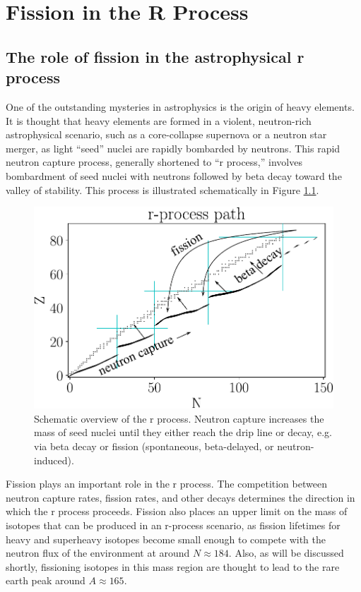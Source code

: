 \chapter{Fission in the R Process}\label{chap:rprocess}

\section{The role of fission in the astrophysical r process}
One of the outstanding mysteries in astrophysics is the origin of heavy elements. It is thought that heavy elements are formed in a violent, neutron-rich astrophysical scenario, such as a core-collapse supernova or a neutron star merger, as light ``seed'' nuclei are rapidly bombarded by neutrons. This rapid neutron capture process, generally shortened to ``r process,'' involves bombardment of seed nuclei with neutrons followed by beta decay toward the valley of stability.  This process is illustrated schematically in Figure \ref{fig:rprocpath}.

\begin{figure}
	\centering
	\includegraphics[width=0.8\linewidth]{TeX_files/rProc_path}
	\caption[Schematic overview of the r process]{Schematic overview of the r process. Neutron capture increases the mass of seed nuclei until they either reach the drip line or decay, e.g. via beta decay or fission (spontaneous, beta-delayed, or neutron-induced).}
	\label{fig:rprocpath}
\end{figure}

Fission plays an important role in the r process. The competition between neutron capture rates, fission rates, and other decays determines the direction in which the r process proceeds. Fission also places an upper limit on the mass of isotopes that can be produced in an r-process scenario, as fission lifetimes for heavy and superheavy isotopes become small enough to compete with the neutron flux of the environment at around $N\approx184$. Also, as will be discussed shortly, fissioning isotopes in this mass region are thought to lead to the rare earth peak around $A\approx165$.

